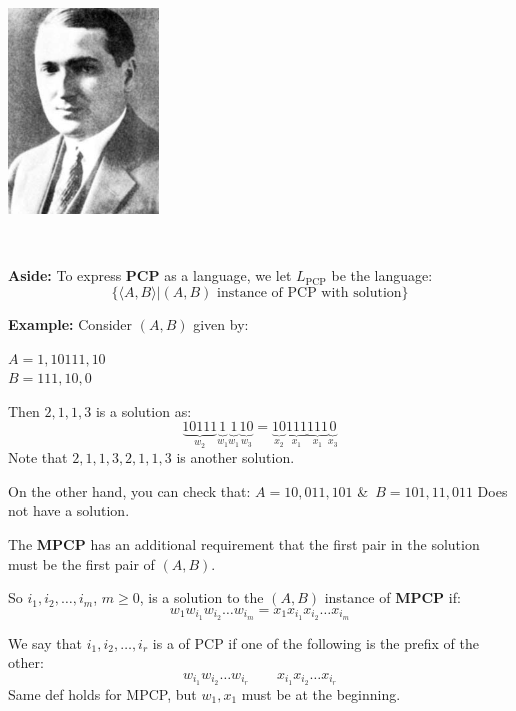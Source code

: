 \begin{frame}
\begin{minipage}{5cm}
\includegraphics[width=4cm]{figures/EmilLeonPost.jpg}
\end{minipage}
\begin{minipage}{5cm}
 \\
\end{minipage}
\end{frame}

\begin{frame}

{\bf Aside:}  To express {\bf PCP} as a language, we let
$L_{\text{PCP}}$ be the language:
$$
\{\langle A,B\rangle|\text{$(A,B)$ instance of PCP with solution}\}
$$

{\bf Example:}  Consider $(A,B)$ given by:

$A=1,10111,10$ \\
$B=111,10,0$

Then $2,1,1,3$ is a solution as:
$$
\underbrace{10111}_{w_2}
\underbrace{1}_{w_1}
\underbrace{1}_{w_1}
\underbrace{10}_{w_3}=
\underbrace{10}_{x_2}
\underbrace{111}_{x_1}
\underbrace{111}_{x_1}
\underbrace{0}_{x_3}
$$
Note that $2,1,1,3,2,1,1,3$ is another solution.  

On the other hand, you can check that:
$A=10,011,101$ \&\
$B=101,11,011$
Does not have a solution.
\end{frame}

\begin{frame}
The {\bf MPCP} has an additional requirement that the first pair in
the solution must be the first pair of $(A,B)$.

So $i_1,i_2,\ldots,i_m$, $m\ge 0$, is a solution to the $(A,B)$
instance of {\bf MPCP} if:
$$
w_1w_{i_1}w_{i_2}\ldots w_{i_m}=x_1x_{i_1}x_{i_2}\ldots x_{i_m}
$$

We say that $i_1,i_2,\ldots,i_r$ is a  of PCP if
one of the following is the prefix of the other:
$$
w_{i_1}w_{i_2}\ldots w_{i_r}\qquad x_{i_1}x_{i_2}\ldots x_{i_r}
$$
Same def holds for MPCP, but $w_1,x_1$ must be at the beginning.
\end{frame}


